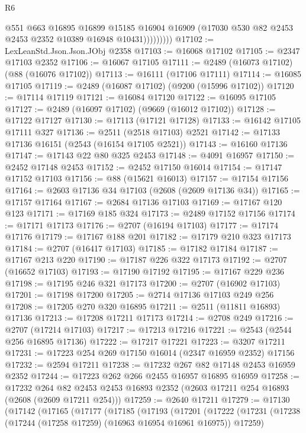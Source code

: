 \begin{lexlean}{R6}
\begin{coremodule}
                    @551
                    @663
                    @16895
                    @16899
                    @15185
                    @16904
                    @16909
                    (@17030 @530 @82 @2453 @2453 @2352 @10389 @16948 @10431)))))))))
@17102 := LexLeanStd.Json.Json.JObj @2358
@17103 := @16068 @17102
@17105 := @2347 @17103 @2352
@17106 := @16067 @17105
@17111 := @2489 (@16073 @17102) (@88 (@16076 @17102))
@17113 := @16111 (@17106 @17111)
@17114 := @16085 @17105
@17119 := @2489 (@16087 @17102) (@9200 (@15996 @17102))
@17120 := @17114 @17119
@17121 := @16084 @17120
@17122 := @16095 @17105
@17127 := @2489 (@16097 @17102) (@9669 (@16012 @17102))
@17128 := @17122 @17127
@17130 := @17113 (@17121 @17128)
@17133 := @16142 @17105 @17111 @327
@17136 := @2511 (@2518 @17103) @2521
@17142 := @17133 @17136 @16151 (@2543 (@16154 @17105 @2521))
@17143 := @16160 @17136
@17147 := @17143 @22 @80 @325 @2453
@17148 := @4091 @16957
@17150 := @2452 @17148 @2453
@17152 := @2452 @17150 @16014
@17154 := @17147 @17152 @17103
@17156 := @88 (@15621 @16013)
@17157 := @17154 @17156
@17164 := @2603 @17136 @34 @17103 (@2608 (@2609 @17136 @34))
@17165 := @17157 @17164
@17167 := @2684 @17136 @17103
@17169 := @17167 @120 @123
@17171 := @17169 @185 @324
@17173 := @2489 @17152 @17156
@17174 := @17171 @17173
@17176 := @2707 (@16194 @17103)
@17177 := @17174 @17176
@17179 := @17167 @188 @201
@17182 := @17179 @210 @323 @17173
@17184 := @2707 (@16417 @17103)
@17185 := @17182 @17184
@17187 := @17167 @213 @220
@17190 := @17187 @226 @322 @17173
@17192 := @2707 (@16652 @17103)
@17193 := @17190 @17192
@17195 := @17167 @229 @236
@17198 := @17195 @246 @321 @17173
@17200 := @2707 (@16902 @17103)
@17201 := @17198 @17200
@17205 := @2714 @17136 @17103 @249 @256
@17208 := @17205 @270 @320 @16895
@17211 := @2511 (@11811 @16893) @17136
@17213 := @17208 @17211 @17173
@17214 := @2708 @249
@17216 := @2707 (@17214 @17103)
@17217 := @17213 @17216
@17221 := @2543 (@2544 @256 @16895 @17136)
@17222 := @17217 @17221
@17223 := @3207 @17211
@17231 := @17223 @254 @269 @17150 @16014 (@2347 @16959 @2352) @17156
@17232 := @2594 @17211
@17238 := @17232 @267 @82 @17148 @2453 @16959 @2352
@17244 := @17223 @262 @266 @2455 @16957 @16895 @16959
@17258 := @17232
    @264
    @82
    @2453
    @2453
    @16893
    @2352
    (@2603 @17211 @254 @16893 (@2608 (@2609 @17211 @254)))
@17259 := @2640 @17211
@17279 := @17130
    (@17142
      (@17165
        (@17177
          (@17185
            (@17193
              (@17201
                (@17222
                  (@17231
                    (@17238 (@17244 (@17258 @17259) (@16963 @16954 @16961 @16975)) @17259)

\end{coremodule}
\end{lexlean}
